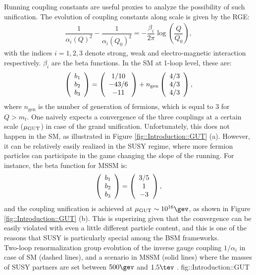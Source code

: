 Running coupling constants are useful proxies to analyze the possibility of such unification.
The evolution of coupling constants along scale is given by the RGE:
\begin{align}
\dfrac{1}{\alpha_i(Q)^2}-\dfrac{1}{\alpha_i(Q_0)^2} = -\dfrac{\beta_i}{2\pi} \log{\left(\dfrac{Q}{Q_0}\right)},
\end{align}
with the indices $i=1,2,3$ denote strong, weak and electro-magnetic interaction respectively.
$\beta_i$ are the beta functions. In the SM at 1-loop level, these are:
\begin{align}
\left( \begin{array}{c} b_1 \\ b_2 \\ b_3 \end{array} \right) = \left( \begin{array}{c}  1/10 \\ -43/6 \\ -11 \end{array} \right) + n_{\mathrm{gen}} \left( \begin{array}{c} 4/3 \\ 4/3 \\ 4/3 \end{array} \right),
\end{align}
where $n_{\mathrm{gen}}$ is the number of generation of fermions, which is equal to $3$ for $Q>m_t$.
One naively expects a convergence of the three couplings at a certain scale ($\mu_{\mathrm{GUT}}$) in case of the grand unification.
Unfortunately, this does not happen in the SM, as illustrated in Figure \ref{fig::Introduction::GUT} (a).
However, it can be relatively easily realized in the SUSY regime, where more fermion particles can participate in the game changing the slope of the running. For instance, the beta function for MSSM is:
\begin{align}
\left( \begin{array}{c} b_1 \\ b_2 \\ b_3 \end{array} \right) = \left( \begin{array}{c} 3/5 \\ 1 \\ -3 \end{array} \right),
\end{align}
and the coupling unification is achieved at $\mu_{\mGUT} \sim 10^{16}\gev$, as shown in Figure \ref{fig::Introduction::GUT} (b). 
This is superizing given that the convergence can be easily violated with even a little different particle content, and this is one of the reasons that SUSY is particularly special among the BSM frameworks.
\\


{Two-loop renormalization group evolution of the inverse gauge coupling $1/\alpha_i$ in case of SM (dashed lines), and a scenario in MSSM (solid lines) where the masses of SUSY partners are set between $500\gev$ and $1.5\tev$ \cite{SUSYPrimer}.}
{fig::Introduction::GUT}




